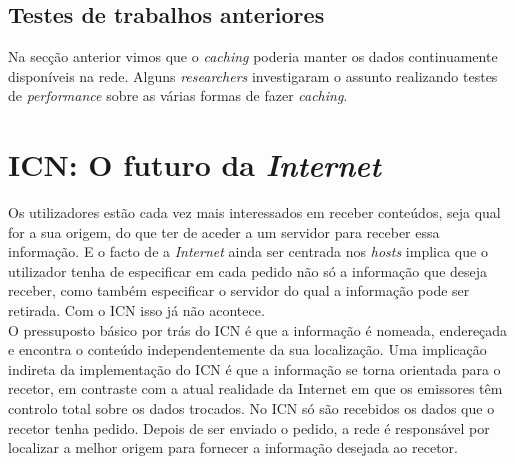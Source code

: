 \documentclass[conference]{IEEEtran}
\begin{document}
\subsection{Testes de trabalhos anteriores}

Na sec\c{c}\~{a}o anterior vimos que o \textit{caching} poderia manter os dados continuamente dispon\'{i}veis na rede. Alguns \textit{researchers} investigaram o assunto realizando testes de \textit{performance} sobre as v\'{a}rias formas de fazer \textit{caching}.








\section{ICN: O futuro da \textit{Internet}}

Os utilizadores est\~{a}o cada vez mais interessados em receber conte\'{u}dos, seja qual for a sua origem, do que ter de aceder a um servidor para receber essa informa\c{c}\~{a}o. E o facto de a \textit{Internet} ainda ser centrada nos \textit{hosts} implica que o utilizador tenha de especificar em cada pedido n\~{a}o s\'{o} a informa\c{c}\~{a}o que deseja receber, como tamb\'{e}m especificar o servidor do qual a informa\c{c}\~{a}o pode ser retirada. Com o ICN isso j\'{a} n\~{a}o acontece\cite{surveyICN}.\\

O pressuposto b\'{a}sico por tr\'{a}s do ICN \'{e} que a informa\c{c}\~{a}o \'{e} nomeada, endere\c{c}ada e encontra o conte\'{u}do independentemente da sua localiza\c{c}\~{a}o. Uma implica\c{c}\~{a}o indireta da implementa\c{c}\~{a}o do ICN \'{e} que a informa\c{c}\~{a}o se torna orientada para o recetor, em contraste com a atual realidade da Internet em que os emissores t\^{e}m controlo total sobre os dados trocados\cite{publishSubscribe}. No ICN s\'{o} s\~{a}o recebidos os dados que o recetor tenha pedido. Depois de ser enviado o pedido, a rede \'{e} respons\'{a}vel por localizar a melhor origem para fornecer a informa\c{c}\~{a}o desejada ao recetor.\\
\end{document}
